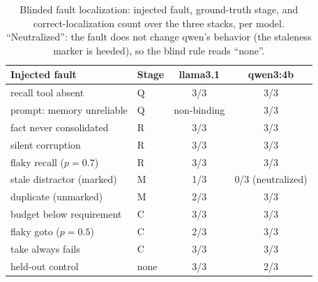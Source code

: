 \documentclass{article}
\begin{document}
\begin{table}[h]
\caption{Blinded fault localization: injected fault, ground-truth
stage, and correct-localization count over the three stacks, per
model. ``Neutralized'': the fault does not change qwen's behavior
(the staleness marker is heeded), so the blind rule reads ``none''.}
\label{p1:tab:meta-eval}
\centering
\small
\begin{tabular}{llcc}
\toprule
Injected fault & Stage & llama3.1 & qwen3:4b \\
\midrule
recall tool absent        & Q & 3/3 & 3/3 \\
prompt: memory unreliable & Q & non-binding & 3/3 \\
fact never consolidated   & R & 3/3 & 3/3 \\
silent corruption         & R & 3/3 & 3/3 \\
flaky recall ($p{=}0.7$)  & R & 3/3 & 3/3 \\
stale distractor (marked) & M & 1/3 & 0/3 (neutralized) \\
duplicate (unmarked)      & M & 2/3 & 3/3 \\
budget below requirement  & C & 3/3 & 3/3 \\
flaky goto ($p{=}0.5$)    & C & 2/3 & 3/3 \\
take always fails         & C & 3/3 & 3/3 \\
\midrule
held-out control          & none & 3/3 & 2/3 \\
\bottomrule
\end{tabular}
\end{table}
\end{document}
